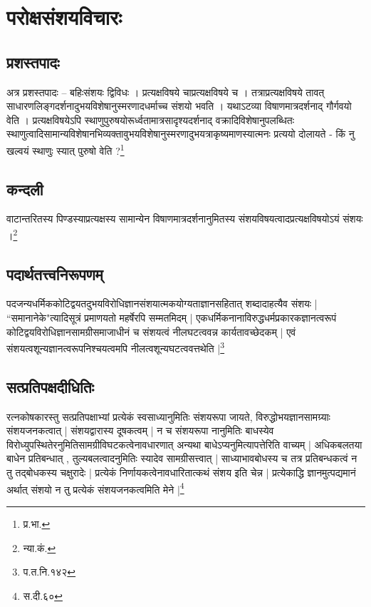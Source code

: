 \chapter{परोक्षसंशयविचारः}

\section{प्रशस्तपादः}
अत्र प्रशस्तपादः – बहिःसंशयः द्विविधः । प्रत्यक्षविषये चाप्रत्यक्षविषये च । तत्राप्रत्यक्षविषये तावत् साधारणलिङ्गदर्शनादुभयविशेषानुस्मरणादधर्माच्च संशयो भवति । यथाऽटव्या विषाणमात्रदर्शनाद् गौर्गवयो वेति । प्रत्यक्षविषयेऽपि स्थाणुपुरुषयोरूर्ध्वतामात्रसादृश्यदर्शनाद् वक्रादिविशेषानुपलब्धितः स्थाणुत्वादिसामान्यविशेषानभिव्यक्तावुभयविशेषानुस्मरणादुभयत्राकृष्यमाणस्यात्मनः प्रत्ययो दोलायते -  किं नु खल्वयं स्थाणुः स्यात् पुरुषो वेति ?\footnote{प्र.भा.}

\section{कन्दली}
वाटान्तरितस्य  पिण्डस्याप्रत्यक्षस्य सामान्येन विषाणमात्रदर्शनानुमितस्य संशयविषयत्वादप्रत्यक्षविषयोऽयं संशयः ।\footnote{न्या.कं.}




\section{पदार्थतत्त्वनिरूपणम्}
पदजन्यधर्मिककोटिद्वयतदुभयविरोधिज्ञानसंशयात्मकयोग्यताज्ञानसहितात् शब्दादाहत्यैव संशयः | “समानानेके"त्यादिसूत्रं प्रमाणयतो महर्षेरपि सम्मतमिदम् | एकधर्मिकनानाविरुद्धधर्मप्रकारकज्ञानत्वरूपं कोटिद्वयविरोधिज्ञानसामग्रीसमाजाधीनं च संशयत्वं नीलघटत्ववन्न कार्यतावच्छेदकम् | एवं संशयत्वशून्यज्ञानत्वरूपनिश्चयत्वमपि नीलत्वशून्यघटत्ववत्तथेति |\footnote{प.त.नि.१४२}


\section{सत्प्रतिपक्षदीधितिः}
रत्नकोषकारस्तु सत्प्रतिपक्षाभ्यां प्रत्येकं स्वसाध्यानुमितिः संशयरूपा जायते, विरुद्धोभयज्ञानसामग्र्याः संशयजनकत्वात् | संशयद्वारास्य दूषकत्वम् | न च संशयरूपा नानुमितिः बाधस्येव विरोध्युपस्थितेरनुमितिसामग्रीविघटकत्वेनावधारणात् अन्यथा बाधेऽप्यनुमित्यापत्तेरिति वाच्यम् | अधिकबलतया बाधेन प्रतिबन्धात् , तुल्यबलत्वादनुमितिः स्यादेव सामग्रीसत्त्वात् | साध्याभावबोधस्य च तत्र प्रतिबन्धकत्वं न तु तद्बोधकस्य चक्षुरादेः | प्रत्येकं निर्णायकत्वेनावधारितात्कथं संशय इति चेन्न | प्रत्येकाद्धि ज्ञानमुत्पद्यमानं अर्थात् संशयो न तु प्रत्येकं संशयजनकत्वमिति मेने |\footnote{स.दी.६०}


